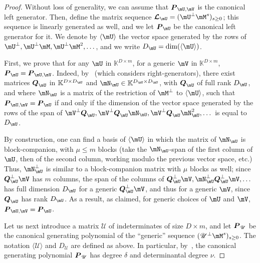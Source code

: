 \documentclass[12pt]{article}
\newcommand{\mat}[1]{\bm{\MakeUppercase{#1}}} %
\newcommand{\seqL}{\mat{\mathcal{L}}} %
\def\K{\mathbb{K}}
\def\K {\ensuremath{\mathbb{K}}}
\def\scrU {\ensuremath{\mathscr{U}}}
\begin{document}
\begin{proof}
  Without loss of generality, we can assume that $\mat{P}_{\mU,\mV}$
  is the canonical left generator. Then, define the matrix sequence
  $\seqL_{\mU} = (\mU^\perp\mM^s)_{s \ge 0}$; this sequence is
  linearly generated as well, and we let $\mat{P}_{\mU}$ be the
  canonical left generator for it.  We denote by $\langle \mU \rangle$
  the vector space generated by the rows of $\mU^\perp,\mU^\perp \mM,
  \mU^\perp{\mM^2},\dots$, and we write $D_\mU=\dim(\langle \mU
  \rangle)$.
	
  First, we prove that for any $\mU$ in $\K^{D \times m}$, for a
  generic $\mV$ in $\K^{D\times m}$,
  $\mat{P}_{\mU}=\mat{P}_{\mU,\mV}$.  Indeed,
  by~\cite[Lemma~4.2]{Villard97a} (which considers right-generators),
  there exist matrices $\mat{Q}_\mU$ in $\K^{D\times D_\mU}$ and
  $\mN_\mU \in \K^{D_\mU \times D_\mU}$, with $\mat{Q}_\mU$ of full
  rank $D_\mU$, and where $\mN_\mU$ is a matrix of the restriction of
  $\mM^\perp$ to $\langle \mU \rangle$, such that
  $\mat{P}_{\mU,\mV}=\mat{P}_{\mU}$ if and only if the dimension of
  the vector space generated by the rows of the span of
  $\mV^\perp\mat{Q}_\mU, \mV^\perp \mat{Q}_\mU \mN_\mU, \mV^\perp
  \mat{Q}_\mU \mN_\mU^2,\dots$ is equal to $D_\mU$.
	
  By construction, one can find a basis of $\langle \mU \rangle$ in
  which the matrix of $\mN_\mU$ is block-companion, with $\mu \le m$
  blocks (take the $\mN_\mU$-span of the first column of $\mU$, then of
  the second column, working modulo the previous vector space, etc.)
  Thus, $\mN^\perp_\mU$ is similar to a block-companion matrix with $\mu$
  blocks as well; since $\mat{Q}_\mU^\perp \mV$ has $m$ columns, the span of
  the columns of
  $\mat{Q}_\mU^\perp \mV,  \mN^\perp_\mU\mat{Q}_\mU^\perp \mV,\dots$
 has full dimension $D_\mU$ for a
  generic $\mat{Q}_\mU^\perp \mV$, and thus for a generic $\mV$, since $\mat{Q}_\mU$ has rank
  $D_\mU$. As a result, as claimed, for generic choices of $\mU$ and $\mV$,
  $\mat{P}_{\mU,\mV}=\mat{P}_{\mU}$.
	
  Let us next introduce a matrix $\scrU$ of indeterminates of size $D
  \times m$, and let $\mat{P}_{\scrU}$ be the canonical generating
  polynomial of the ``generic'' sequence $(\scrU^\perp \mM^s)_{s \ge
    0}$. The notation $\langle \scrU \rangle$ and $D_\scrU$ are
  defined as above.  In particular,
  by~\cite[Proposition~6.1]{Villard97a}, the canonical generating
  polynomial $\mat{P}_{\scrU}$ has degree $\delta$ and determinantal
  degree $\nu$.
  

\end{proof}
\end{document}
